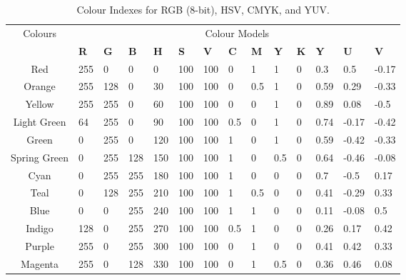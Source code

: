 \begin{table}[h]
\begin{center}
\begin{tabular}{|c|lll|lll|llll|lll|}\hline
Colours      & \multicolumn{13}{c}{Colour Models} \\
             & \textbf{R}   & \textbf{G}   & \textbf{B}   & \textbf{H}   & \textbf{S}   & \textbf{V}   & \textbf{C}   & \textbf{M}   & \textbf{Y}   & \textbf{K} & \textbf{Y}    & \textbf{U}     & \textbf{V}     \\\hline					\cellcolor{RED}
Red          & 255 & 0   & 0   & 0   & 100 & 100 & 0   & 1   & 1   & 0 & 0.3  & 0.5   & -0.17 \\		\cellcolor{ORANGE}
Orange       & 255 & 128 & 0   & 30  & 100 & 100 & 0   & 0.5 & 1   & 0 & 0.59 & 0.29  & -0.33 \\		\cellcolor{YELLOW}
Yellow       & 255 & 255 & 0   & 60  & 100 & 100 & 0   & 0   & 1   & 0 & 0.89 & 0.08  & -0.5  \\		\cellcolor{LGREEN}
Light Green  & 64  & 255 & 0   & 90  & 100 & 100 & 0.5 & 0   & 1   & 0 & 0.74 & -0.17 & -0.42 \\		\cellcolor{GREEN}
Green        & 0   & 255 & 0   & 120 & 100 & 100 & 1   & 0   & 1   & 0 & 0.59 & -0.42 & -0.33 \\		\cellcolor{SGREEN}
Spring Green & 0   & 255 & 128 & 150 & 100 & 100 & 1   & 0   & 0.5 & 0 & 0.64 & -0.46 & -0.08 \\		\cellcolor{CYAN}
Cyan         & 0   & 255 & 255 & 180 & 100 & 100 & 1   & 0   & 0   & 0 & 0.7  & -0.5  & 0.17  \\		\cellcolor{TEAL}
Teal         & 0   & 128 & 255 & 210 & 100 & 100 & 1   & 0.5 & 0   & 0 & 0.41 & -0.29 & 0.33  \\		\cellcolor{BLUE}
Blue         & 0   & 0   & 255 & 240 & 100 & 100 & 1   & 1   & 0   & 0 & 0.11 & -0.08 & 0.5   \\		\cellcolor{INDIGO}
Indigo       & 128 & 0   & 255 & 270 & 100 & 100 & 0.5 & 1   & 0   & 0 & 0.26 & 0.17  & 0.42  \\		\cellcolor{PURPLE}
Purple       & 255 & 0   & 255 & 300 & 100 & 100 & 0   & 1   & 0   & 0 & 0.41 & 0.42  & 0.33  \\		\cellcolor{MAGENTA}
Magenta      & 255 & 0   & 128 & 330 & 100 & 100 & 0   & 1   & 0.5 & 0 & 0.36 & 0.46  & 0.08  \\\hline
\end{tabular}
\end{center}
\vspace{-15pt}
\caption[Colour Indexes]{Colour Indexes for RGB (8-bit), HSV, CMYK, and YUV.}\label{table:app:colours}
\end{table}


